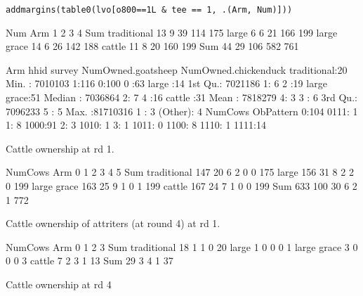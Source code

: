 \verb|addmargins(table0(lvo[o800==1L & tee == 1, .(Arm, Num)]))|
\begin{Schunk}
\begin{Soutput}
             Num
Arm             1   2   3   4 Sum
  traditional  13   9  39 114 175
  large         6   6  21 166 199
  large grace  14   6  26 142 188
  cattle       11   8  20 160 199
  Sum          44  29 106 582 761
\end{Soutput}
\begin{Soutput}
          Arm          hhid          survey  NumOwned.goatsheep NumOwned.chickenduck
 traditional:20   Min.   : 7010103   1:116   0:100              0      :63          
 large      :14   1st Qu.: 7021186           1:  6              2      :19          
 large grace:51   Median : 7036864           2:  7              4      :16          
 cattle     :31   Mean   : 7818279           4:  3              3      : 6          
                  3rd Qu.: 7096233                              5      : 5          
                  Max.   :81710316                              1      : 3          
                                                                (Other): 4          
 NumCows ObPattern
 0:104   0111: 1  
 1:  8   1000:91  
 2:  3   1010: 1  
 3:  1   1011: 0  
         1100: 8  
         1110: 1  
         1111:14  
\end{Soutput}
\end{Schunk}
Cattle ownership at rd 1.
\begin{Schunk}
\begin{Soutput}
             NumCows
Arm             0   1   2   3   4   5 Sum
  traditional 147  20   6   2   0   0 175
  large       156  31   8   2   2   0 199
  large grace 163  25   9   1   0   1 199
  cattle      167  24   7   1   0   0 199
  Sum         633 100  30   6   2   1 772
\end{Soutput}
\end{Schunk}
Cattle ownership of attriters (at round 4) at rd 1.
\begin{Schunk}
\begin{Soutput}
             NumCows
Arm            0  1  2  3 Sum
  traditional 18  1  1  0  20
  large        1  0  0  0   1
  large grace  3  0  0  0   3
  cattle       7  2  3  1  13
  Sum         29  3  4  1  37
\end{Soutput}
\end{Schunk}
Cattle ownership at rd 4 
